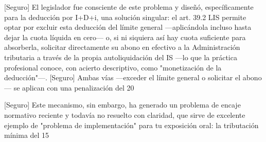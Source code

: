 \documentclass[10pt,a4paper]{article}
\begin{document}
[Seguro] El legislador fue consciente de este problema y diseñó, específicamente para la deducción por I+D+i, una solución singular: el art. 39.2 LIS permite optar por excluir esta deducción del límite general —aplicándola incluso hasta dejar la cuota líquida en cero— o, si ni siquiera así hay cuota suficiente para absorberla, solicitar directamente su abono en efectivo a la Administración tributaria a través de la propia autoliquidación del IS —lo que la práctica profesional conoce, con acierto descriptivo, como "monetización de la deducción"—. [Seguro] Ambas vías —exceder el límite general o solicitar el abono— se aplican con una penalización del 20%

[Seguro] Este mecanismo, sin embargo, ha generado un problema de encaje normativo reciente y todavía no resuelto con claridad, que sirve de excelente ejemplo de "problema de implementación" para tu exposición oral: la tributación mínima del 15%
\end{document}
